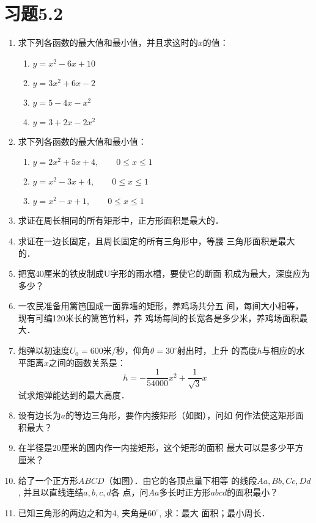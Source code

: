 \section*{习题5.2}
\begin{enumerate}
    \item 求下列各函数的最大值和最小值，并且求这时的$x$的值：
\begin{multicols}{2}
\begin{enumerate}
    \item $y=x^2-6x+10$
    \item $y=3x^2+6x-2$
    \item $y=5-4x-x^2$
    \item $y=3+2x-2x^2$
\end{enumerate}
\end{multicols}
    \item 求下列各函数的最大值和最小值：
\begin{enumerate}
    \item $y=2x^2+5x+4,\qquad    0\le x\le 1$
    \item $y=x^2-3x+4,\qquad      0\le x\le 1$
    \item $y=x^2-x+1,\qquad      0\le x\le 1$
\end{enumerate}
\item 求证在周长相同的所有矩形中，正方形面积是最大的．
\item 求证在一边长固定，且周长固定的所有三角形中，等腰
三角形面积是最大的．
\item 把宽40厘米的铁皮制成U字形的雨水槽，要使它的断面
积成为最大，深度应为多少？
\item 一农民准备用篱笆围成一面靠墙的矩形，养鸡场共分五
间，每间大小相等，现有可编120米长的篱笆竹料，养
鸡场每间的长宽各是多少米，养鸡场面积最大．
\item 炮弹以初速度$U_0=600$米/秒，仰角$\theta=30^{\circ}$射出时，上升
的高度$h$与相应的水平距离$x$之间的函数关系是：
\[h=-\frac{1}{54000}x^2+\frac{1}{\sqrt{3}}x\]
试求炮弹能达到的最大高度．
\item 设有边长为$a$的等边三角形，要作内接矩形（如图），问如
何作法使这矩形面积最大？
\item 在半径是20厘米的圆内作一内接矩形，这个矩形的面积
最大可以是多少平方厘米？
\item 给了一个正方形$ABCD$（如图）．由它的各顶点量下相等
的线段$Aa,Bb,Cc,Dd$, 并且以直线连结$a,b,c,d$各
点，问$Aa$多长时正方形$abcd$的面积最小？
\item 已知三角形的两边之和为4, 夹角是$60^{\circ}$, 求：最大
面积；最小周长．


\end{enumerate}
